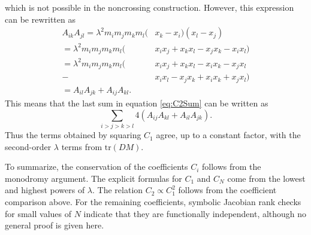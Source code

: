 \documentclass[english,master]{liumaiex}
\theoremstyle{thesisplain}
\theoremstyle{thesisdefinition}
\newcommand{\tr}{\text{tr}}
\numberwithin{equation}{section}
\newcommand{\dotposition}[1]{
    ({360/\n * (#1) + 90}:\radius)
}
\begin{document}
\begin{center}
\end{center}
which is not possible in the noncrossing construction. However, this expression can be rewritten as
\begin{equation}
\begin{aligned}
	A_{ik} A_{jl}
	= \lambda^2 m_i m_j m_k m_l (&x_k - x_i) (x_l - x_j) \\
	= \lambda^2 m_i m_j m_k m_l (&x_i x_j + x_k x_l - x_j x_k - x_i x_l) \\
	= \lambda^2 m_i m_j m_k m_l (
	&x_i x_j + x_k x_l - x_i x_k - x_j x_l \\
	-&x_i x_l - x_j x_k + x_i x_k + x_j x_l) \\
	= A_{il} A_{jk} + A_{ij} A_{kl}.
\end{aligned}
\end{equation}
This means that the last sum in equation \eqref{eq:C2Sum} can be written as
\begin{equation}
	\sum_{i > j > k > l} 4 (A_{ij} A_{kl} + A_{il} A_{jk}).
\end{equation}
Thus the terms obtained by squaring $C_1$ agree, up to a constant factor, with the second-order $\lambda$ terms from $\tr(DM)$.

To summarize, the conservation of the coefficients $C_i$ follows from the monodromy argument. The explicit formulas for $C_1$ and $C_N$ come from the lowest and highest powers of $\lambda$. The relation $C_2 \propto C_1^2$ follows from the coefficient comparison above. For the remaining coefficients, symbolic Jacobian rank checks for small values of $N$ indicate that they are functionally independent, although no general proof is given here.
\end{document}
